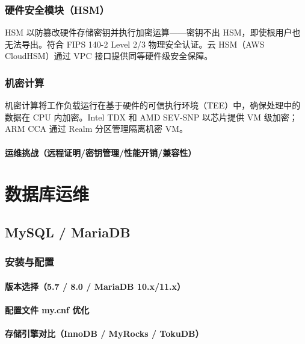 \documentclass[12pt,UTF8]{ctexbook}
\begin{document}
  \section{硬件安全模块（HSM）}

HSM 以防篡改硬件存储密钥并执行加密运算——密钥不出 HSM，即使根用户也无法导出。符合 FIPS 140-2 Level 2/3 物理安全认证。云 HSM（AWS CloudHSM）通过 VPC 接口提供同等硬件级安全保障。

  \section{机密计算}

机密计算将工作负载运行在基于硬件的可信执行环境（TEE）中，确保处理中的数据在 CPU 内加密。Intel TDX 和 AMD SEV-SNP 以芯片提供 VM 级加密；ARM CCA 通过 Realm 分区管理隔离机密 VM。

\subsection{运维挑战（远程证明/密钥管理/性能开销/兼容性）}



\part{数据库运维}

\chapter{MySQL / MariaDB}
\label{chap:mysql}

  \section{安装与配置}
    \subsection{版本选择（5.7 / 8.0 / MariaDB 10.x/11.x）}
    \subsection{配置文件 my.cnf 优化}
    \subsection{存储引擎对比（InnoDB / MyRocks / TokuDB）}
\end{document}
